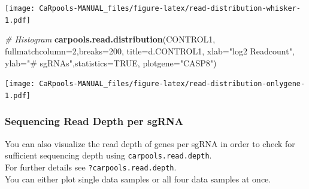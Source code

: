 \documentclass[]{article}
\newenvironment{Shaded}{\begin{snugshade}}{\end{snugshade}}
\newcommand{\KeywordTok}[1]{\textcolor[rgb]{0.13,0.29,0.53}{\textbf{{#1}}}}
\newcommand{\DataTypeTok}[1]{\textcolor[rgb]{0.13,0.29,0.53}{{#1}}}
\newcommand{\DecValTok}[1]{\textcolor[rgb]{0.00,0.00,0.81}{{#1}}}
\newcommand{\StringTok}[1]{\textcolor[rgb]{0.31,0.60,0.02}{{#1}}}
\newcommand{\CommentTok}[1]{\textcolor[rgb]{0.56,0.35,0.01}{\textit{{#1}}}}
\newcommand{\OtherTok}[1]{\textcolor[rgb]{0.56,0.35,0.01}{{#1}}}
\newcommand{\NormalTok}[1]{{#1}}
\begin{document}
\texttt{[image: CaRpools-MANUAL\_files/figure-latex/read-distribution-whisker-1.pdf]}

\begin{Shaded}
\begin{Highlighting}[]
\CommentTok{# Histogram}
\KeywordTok{carpools.read.distribution}\NormalTok{(CONTROL1, }\DataTypeTok{fullmatchcolumn=}\DecValTok{2}\NormalTok{,}\DataTypeTok{breaks=}\DecValTok{200}\NormalTok{,}
  \DataTypeTok{title=}\NormalTok{d.CONTROL1, }\DataTypeTok{xlab=}\StringTok{"log2 Readcount"}\NormalTok{, }\DataTypeTok{ylab=}\StringTok{"# sgRNAs"}\NormalTok{,}\DataTypeTok{statistics=}\OtherTok{TRUE}\NormalTok{, }\DataTypeTok{plotgene=}\StringTok{"CASP8"}\NormalTok{) }
\end{Highlighting}
\end{Shaded}

\texttt{[image: CaRpools-MANUAL\_files/figure-latex/read-distribution-onlygene-1.pdf]}

\subsubsection{Sequencing Read Depth per
sgRNA}\label{sequencing-read-depth-per-sgrna}

You can also visualize the read depth of genes per sgRNA in order to
check for sufficient sequencing depth using
\texttt{carpools.read.depth}.\\
For further details see \texttt{?carpools.read.depth}.\\
You can either plot single data samples or all four data samples at
once.
\end{document}
